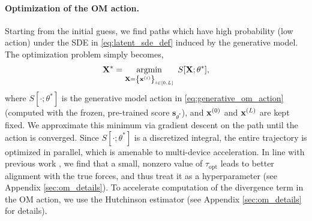 \paragraph{Optimization of the OM action.}
Starting from the initial guess, we find paths which have high probability (low action) under the SDE in \eqref{eq:latent_sde_def} induced by the generative model. The optimization problem simply becomes,
\vspace{-3 pt}
\begin{equation}
\label{eq:action_minimization_problem_fixed_endpoints}
    \mathbf{X}^* = \argmin_{\mathbf{X} = \left\{ \mathbf{x}^{(i)} \right\}_{i \in \left[0, L \right]}} \ S[\mathbf{X}; \theta^*],
\end{equation}
where $S[\cdot ; \theta^*]$ is the generative model action in \eqref{eq:generative_om_action} (computed with the frozen, pre-trained score $\mathbf{s}_{\theta^*}$), and $\mathbf{x}^{(0)}$ and $\mathbf{x}^{(L)}$ are kept fixed. We approximate this minimum via gradient descent on the path until the action is converged. Since $S[\cdot;\theta^*]$ is a discretized integral, the entire trajectory is optimized in parallel, which is amenable to multi-device acceleration. In line with previous work \cite{arts2023two}, we find that a small, nonzero value of $\tau_\text{opt}$ leads to better alignment with the true forces, and thus treat it as a hyperparameter (see Appendix \ref{sec:om_details}). To accelerate computation of the divergence term in the OM action, we use the Hutchinson estimator \cite{hutchinson1989stochastic}(see Appendix \ref{sec:om_details} for details).
\vspace{-10pt}
